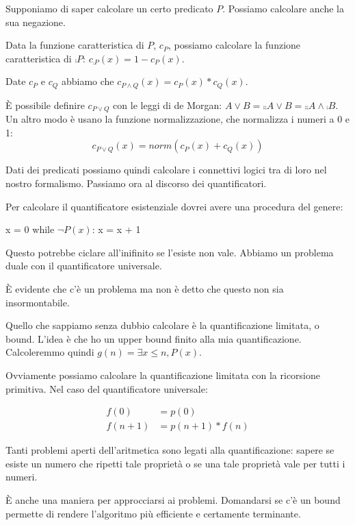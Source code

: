 Supponiamo di saper calcolare un certo predicato $P$. Possiamo calcolare anche la sua negazione.

Data la funzione caratteristica di $P$, $c_{P}$, possiamo calcolare la funzione caratteristica di
$\comp{P}$: $c_{\comp{P}}(x) = 1 - c_{P}(x)$.

Date $c_{P}$ e $c_{Q}$ abbiamo che $c_{P \land Q}(x) = c_{P}(x) *
c_{Q}(x)$.

È possibile definire $c_{P \lor Q}$ con le leggi di de Morgan: $A \lor B = \comp{\comp{A \lor B}} =
\comp{\comp{A} \land \comp{B}}$. Un altro modo è usano la funzione normalizzazione, che normalizza i
numeri a 0 e 1:
\begin{equation*}
    c_{P \lor Q}(x) = \textit{norm}(c_{P}(x) + c_{Q}(x))
\end{equation*}

Dati dei predicati possiamo quindi calcolare i connettivi logici tra di loro nel nostro formalismo.
Passiamo ora al discorso dei quantificatori.

Per calcolare il quantificatore esistenziale dovrei avere una procedura del genere:

\begin{python}
x = 0
while $\lnot P(x)$:
    x = x + 1
\end{python}

Questo potrebbe ciclare all'inifinito se l'esiste non vale. Abbiamo un problema duale con il
quantificatore universale.

È evidente che c'è un problema ma non è detto che questo non sia insormontabile.

Quello che sappiamo senza dubbio calcolare è la quantificazione limitata, o bound. L'idea è che
ho un upper bound finito alla mia quantificazione. Calcoleremmo quindi $g(n) = \exists x \leq n,
P(x)$.

Ovviamente possiamo calcolare la quantificazione limitata con la ricorsione primitiva. Nel caso del
quantificatore universale:

\begin{align*}
    f(0) &= p(0) \\
    f(n+1) &= p(n+1)*f(n)
\end{align*}

Tanti problemi aperti dell'aritmetica sono legati alla quantificazione: sapere se esiste un numero
che ripetti tale proprietà o se una tale proprietà vale per tutti i numeri.

È anche una maniera per approcciarsi ai problemi. Domandarsi se c'è un bound permette di rendere
l'algoritmo più efficiente e certamente terminante.

